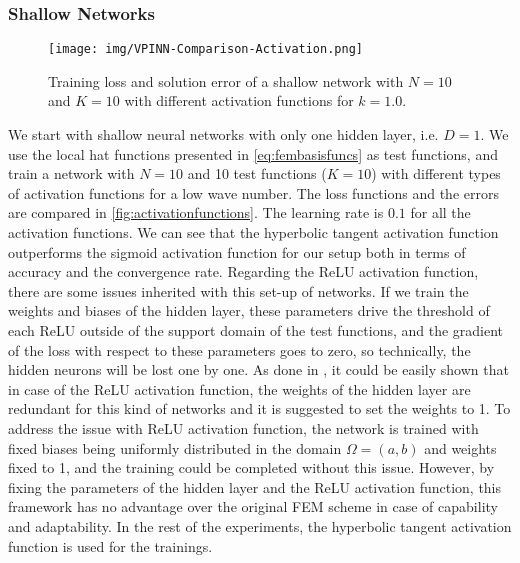 \subsubsection{Shallow Networks} \label{sec:vpinnsshallowresults}

\begin{figure}[h!]
    \centering
    \texttt{[image: img/VPINN-Comparison-Activation.png]}
    \caption{Training loss and solution error of a shallow network with $N=10$ and $K=10$ with different activation functions for $k=1.0$.}
    \label{fig:activationfunctions}
\end{figure}

We start with shallow neural networks with only one hidden layer, i.e. $D=1$. We use the local hat functions presented in \eqref{eq:fembasisfuncs} as test functions, and train a network with $N=10$ and 10 test functions ($K=10$) with different types of activation functions for a low wave number. The loss functions and the errors are compared in \autoref{fig:activationfunctions}. The learning rate is $0.1$ for all the activation functions. We can see that the hyperbolic tangent activation function outperforms the sigmoid activation function for our setup both in terms of accuracy and the convergence rate. Regarding the ReLU activation function, there are some issues inherited with this set-up of networks. If we train the weights and biases of the hidden layer, these parameters drive the threshold of each ReLU outside of the support domain of the test functions, and the gradient of the loss with respect to these parameters goes to zero, so technically, the hidden neurons will be lost one by one. As done in \cite{liu2021}, it could be easily shown that in case of the ReLU activation function, the weights of the hidden layer are redundant for this kind of networks and it is suggested to set the weights to 1. To address the issue with ReLU activation function, the network is trained with fixed biases being uniformly distributed in the domain $\Omega=(a, b)$ and weights fixed to 1, and the training could be completed without this issue. However, by fixing the parameters of the hidden layer and the ReLU activation function, this framework has no advantage over the original FEM scheme in case of capability and adaptability. In the rest of the experiments, the hyperbolic tangent activation function is used for the trainings.


